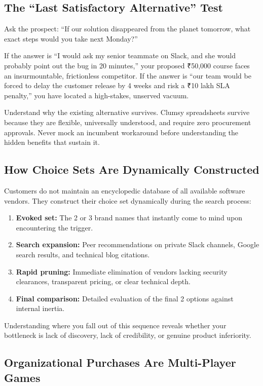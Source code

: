 \subsection{The ``Last Satisfactory Alternative'' Test}

Ask the prospect: ``If our solution disappeared from the planet tomorrow, what exact steps would you take next Monday?''

If the answer is ``I would ask my senior teammate on Slack, and she would probably point out the bug in 20 minutes,'' your proposed ₹50,000 course faces an insurmountable, frictionless competitor. If the answer is ``our team would be forced to delay the customer release by 4 weeks and risk a ₹10 lakh SLA penalty,'' you have located a high-stakes, unserved vacuum.

Understand why the existing alternative survives. Clumsy spreadsheets survive because they are flexible, universally understood, and require zero procurement approvals. Never mock an incumbent workaround before understanding the hidden benefits that sustain it.

\subsection{How Choice Sets Are Dynamically Constructed}

Customers do not maintain an encyclopedic database of all available software vendors. They construct their choice set dynamically during the search process:
\begin{enumerate}[leftmargin=1.2em,itemsep=0.2ex]
  \item \textbf{Evoked set:} The 2 or 3 brand names that instantly come to mind upon encountering the trigger.
  \item \textbf{Search expansion:} Peer recommendations on private Slack channels, Google search results, and technical blog citations.
  \item \textbf{Rapid pruning:} Immediate elimination of vendors lacking security clearances, transparent pricing, or clear technical depth.
  \item \textbf{Final comparison:} Detailed evaluation of the final 2 options against internal inertia.
\end{enumerate}
Understanding where you fall out of this sequence reveals whether your bottleneck is lack of discovery, lack of credibility, or genuine product inferiority.

\subsection{Organizational Purchases Are Multi-Player Games}


